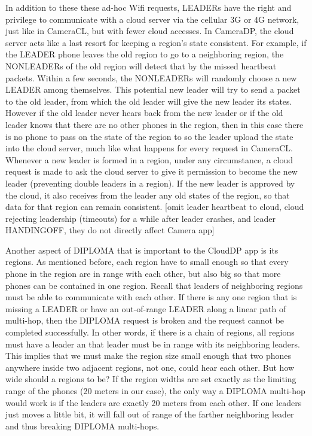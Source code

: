In addition to these these ad-hoc Wifi requests, LEADERs have the right and privilege to communicate with a cloud server via the cellular 3G or 4G network, just like in CameraCL, but with fewer cloud accesses. In CameraDP, the cloud server acts like a last resort for keeping a region's state consistent. For example, if the LEADER phone leaves the old region to go to a neighboring region, the NONLEADERs of the old region will detect that by the missed heartbeat packets. Within a few seconds, the NONLEADERs will randomly choose a new LEADER among themselves. This potential new leader will try to send a packet to the old leader, from which the old leader will give the new leader its states. However if the old leader never hears back from the new leader or if the old leader knows that there are no other phones in the region, then in this case there is no phone to pass on the state of the region to so the leader upload the state into the cloud server, much like what happens for every request in CameraCL.  Whenever a new leader is formed in a region, under any circumstance, a cloud request is made to ask the cloud server to give it permission to become the new leader (preventing double leaders in a region). If the new leader is approved by the cloud, it also receives from the leader any old states of the region, so that data for that region can remain consistent.
[omit leader heartbeat to cloud, cloud rejecting leadership (timeouts) for a while after leader crashes, and leader HANDINGOFF, they do not directly affect Camera app]

Another aspect of DIPLOMA that is important to the CloudDP app is its regions. As mentioned before, each region have to small enough so that every phone in the region are in range with each other, but also big so that more phones can be contained in one region. Recall that leaders of neighboring regions must be able to communicate with each other. If there is any one region that is missing a LEADER or have an out-of-range LEADER along a linear path of multi-hop, then the DIPLOMA request is broken and the request cannot be completed successfully. In other words, if there is a chain of regions, all regions must have a leader an that leader must be in range with its neighboring leaders. This implies that we must make the region size small enough that two phones anywhere inside two adjacent regions, not one, could hear each other.  But how wide should a regions to be? If the region widths are set exactly as the limiting range of the phones (20 meters in our case), the only way a DIPLOMA multi-hop would work is if the leaders are exactly 20 meters from each other. If one leaders just moves a little bit, it will fall out of range of the farther neighboring leader and thus breaking DIPLOMA multi-hops.

